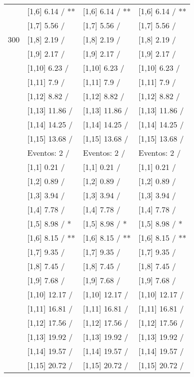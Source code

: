 \begin{table}
\begin{tabular}[t]{llll}
 & {}[1,6] 6.14  / ** & {}[1,6] 6.14  / ** & {}[1,6] 6.14  / **\\
 & {}[1,7] 5.56  / & {}[1,7] 5.56  / & {}[1,7] 5.56  /\\
300 & {}[1,8] 2.19  / & {}[1,8] 2.19  / & {}[1,8] 2.19  /\\
\addlinespace
 & {}[1,9] 2.17  / & {}[1,9] 2.17  / & {}[1,9] 2.17  /\\
 & {}[1,10] 6.23  / & {}[1,10] 6.23  / & {}[1,10] 6.23  /\\
 & {}[1,11] 7.9  / & {}[1,11] 7.9  / & {}[1,11] 7.9  /\\
 & {}[1,12] 8.82  / & {}[1,12] 8.82  / & {}[1,12] 8.82  /\\
 & {}[1,13] 11.86  / & {}[1,13] 11.86  / & {}[1,13] 11.86  /\\
\addlinespace
 & {}[1,14] 14.25  / & {}[1,14] 14.25  / & {}[1,14] 14.25  /\\
 & {}[1,15] 13.68  / & {}[1,15] 13.68  / & {}[1,15] 13.68  /\\
 & Eventos:  2 / & Eventos:  2 / & Eventos:  2 /\\
 & {}[1,1] 0.21  / & {}[1,1] 0.21  / & {}[1,1] 0.21  /\\
 & {}[1,2] 0.89  / & {}[1,2] 0.89  / & {}[1,2] 0.89  /\\
\addlinespace
 & {}[1,3] 3.94  / & {}[1,3] 3.94  / & {}[1,3] 3.94  /\\
 & {}[1,4] 7.78  / & {}[1,4] 7.78  / & {}[1,4] 7.78  /\\
 & {}[1,5] 8.98  / * & {}[1,5] 8.98  / * & {}[1,5] 8.98  / *\\
 & {}[1,6] 8.15  / ** & {}[1,6] 8.15  / ** & {}[1,6] 8.15  / **\\
 & {}[1,7] 9.35  / & {}[1,7] 9.35  / & {}[1,7] 9.35  /\\
\addlinespace
500 & {}[1,8] 7.45  / & {}[1,8] 7.45  / & {}[1,8] 7.45  /\\
 & {}[1,9] 7.68  / & {}[1,9] 7.68  / & {}[1,9] 7.68  /\\
 & {}[1,10] 12.17  / & {}[1,10] 12.17  / & {}[1,10] 12.17  /\\
 & {}[1,11] 16.81  / & {}[1,11] 16.81  / & {}[1,11] 16.81  /\\
 & {}[1,12] 17.56  / & {}[1,12] 17.56  / & {}[1,12] 17.56  /\\
\addlinespace
 & {}[1,13] 19.92  / & {}[1,13] 19.92  / & {}[1,13] 19.92  /\\
 & {}[1,14] 19.57  / & {}[1,14] 19.57  / & {}[1,14] 19.57  /\\
 & {}[1,15] 20.72  / & {}[1,15] 20.72  / & {}[1,15] 20.72  /\\
\bottomrule
\end{tabular}
\end{table}
